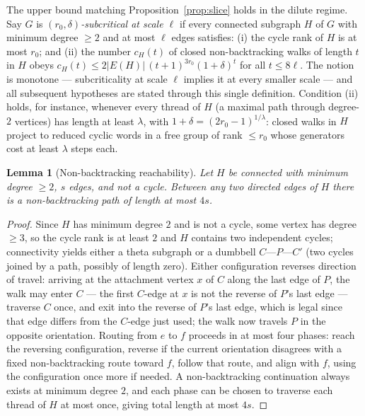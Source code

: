 \documentclass[11pt]{article}
\newtheorem{lemma}{Lemma}
\theoremstyle{remark}
\begin{document}
The upper bound matching Proposition~\ref{prop:slice} holds in the
dilute regime. Say $G$ is \emph{$(r_0,\delta)$-subcritical at scale
$\ell$} if every connected subgraph $H$ of $G$ with minimum degree
$\ge2$ and at most $\ell$ edges satisfies: (i) the cycle rank of $H$
is at most $r_0$; and (ii) the number $c_H(t)$ of closed
non-backtracking walks of length $t$ in $H$ obeys
$c_H(t)\le 2|E(H)|\,(t+1)^{3r_0}(1+\delta)^{t}$ for all $t\le8\ell$.
The notion is monotone --- subcriticality at scale $\ell$ implies it
at every smaller scale --- and all subsequent hypotheses are stated
through this single definition.
Condition (ii) holds, for instance, whenever every thread of $H$ (a
maximal path through degree-$2$ vertices) has length at least
$\lambda$, with $1+\delta=(2r_0-1)^{1/\lambda}$: closed walks in $H$
project to reduced cyclic words in a free group of rank $\le r_0$ whose
generators cost at least $\lambda$ steps each.

\begin{lemma}[Non-backtracking reachability]\label{lem:reach}
Let $H$ be connected with minimum degree $\ge2$, $s$ edges, and not a
cycle. Between any two directed edges of $H$ there is a
non-backtracking path of length at most $4s$.
\end{lemma}

\begin{proof}
Since $H$ has minimum degree $2$ and is not a cycle, some vertex has
degree $\ge3$, so the cycle rank is at least $2$ and $H$ contains two
independent cycles; connectivity yields either a theta subgraph or a
dumbbell $C$---$P$---$C'$ (two cycles joined by a path, possibly of
length zero). Either configuration reverses direction of travel:
arriving at the attachment vertex $x$ of $C$ along the last edge of
$P$, the walk may enter $C$ --- the first $C$-edge at $x$ is not the
reverse of $P$'s last edge --- traverse $C$ once, and exit into the
reverse of $P$'s last edge, which is legal since that edge differs
from the $C$-edge just used; the walk now travels $P$ in the opposite
orientation. Routing from $e$ to $f$ proceeds in at most four phases:
reach the reversing configuration, reverse if the current orientation
disagrees with a fixed non-backtracking route toward $f$, follow that
route, and align with $f$, using the configuration once more if
needed. A non-backtracking continuation always exists at minimum
degree $2$, and each phase can be chosen to traverse each thread of
$H$ at most once, giving total length at most $4s$.
\end{proof}
\end{document}
